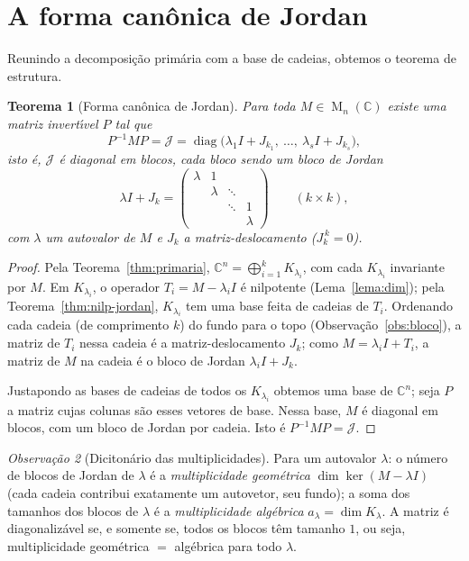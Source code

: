\documentclass[11pt,a4paper]{amsart}
\newcommand{\C}{\mathbb{C}}
\DeclareMathOperator{\diag}{diag}
\DeclareMathOperator{\Mat}{M}
\theoremstyle{plain}
\newtheorem{teorema}{Teorema}[section]
\theoremstyle{definition}
\theoremstyle{remark}
\newtheorem{observacao}[teorema]{Observação}
\begin{document}
\section{A forma can\^onica de Jordan}
\label{sec:jordan}

Reunindo a decomposi\c{c}\~ao prim\'aria com a base de cadeias, obtemos o
teorema de estrutura.

\begin{teorema}[Forma can\^onica de Jordan]\label{thm:jordan}
Para toda $M\in\Mat_n(\C)$ existe uma matriz invert\'\i vel $P$ tal que
\[
  P^{-1}MP = \mathcal{J} = \diag\big(\lambda_1 I + J_{k_1},\ \dots,\
  \lambda_s I + J_{k_s}\big),
\]
isto \'e, $\mathcal{J}$ \'e diagonal em blocos, cada bloco sendo um bloco de
Jordan
\[
  \lambda I + J_k =
  \begin{pmatrix}
    \lambda & 1 & & \\
    & \lambda & \ddots & \\
    & & \ddots & 1\\
    & & & \lambda
  \end{pmatrix}
  \qquad(k\times k),
\]
com $\lambda$ um autovalor de $M$ e $J_k$ a matriz-deslocamento ($J_k^{\,k}=0$).
\end{teorema}

\begin{proof}
Pela Teorema~\ref{thm:primaria},
$\C^n=\bigoplus_{i=1}^{k}K_{\lambda_i}$, com cada $K_{\lambda_i}$ invariante por
$M$. Em $K_{\lambda_i}$, o operador $T_i=M-\lambda_i I$ \'e nilpotente
(Lema~\ref{lema:dim}); pela
Teorema~\ref{thm:nilp-jordan}, $K_{\lambda_i}$ tem uma base feita de
cadeias de $T_i$. Ordenando cada cadeia (de comprimento $k$) do fundo para o
topo (Observa\c{c}\~ao~\ref{obs:bloco}), a matriz de $T_i$ nessa cadeia \'e a
matriz-deslocamento $J_k$; como $M=\lambda_i I + T_i$, a matriz de $M$ na
cadeia \'e o bloco de Jordan $\lambda_i I + J_k$.

Justapondo as bases de cadeias de todos os $K_{\lambda_i}$ obtemos uma base de
$\C^n$; seja $P$ a matriz cujas colunas s\~ao esses vetores de base. Nessa
base, $M$ \'e diagonal em blocos, com um bloco de Jordan por cadeia. Isto \'e
$P^{-1}MP=\mathcal{J}$.
\end{proof}

\begin{observacao}[Diciton\'ario das multiplicidades]
Para um autovalor $\lambda$: o n\'umero de blocos de Jordan de $\lambda$ \'e a
\emph{multiplicidade geom\'etrica} $\dim\ker(M-\lambda I)$ (cada cadeia
contribui exatamente um autovetor, seu fundo); a soma dos tamanhos dos blocos
de $\lambda$ \'e a \emph{multiplicidade alg\'ebrica} $a_\lambda=\dim
K_\lambda$. A matriz \'e diagonaliz\'avel se, e somente se, todos os blocos
t\^em tamanho $1$, ou seja, multiplicidade geom\'etrica $=$ alg\'ebrica para
todo $\lambda$.
\end{observacao}
\end{document}
